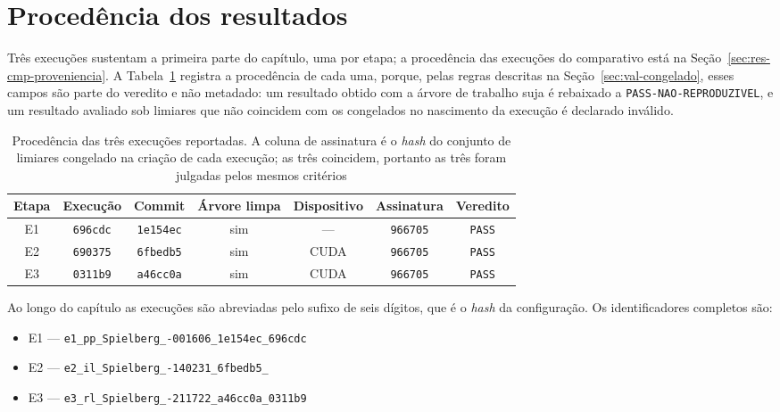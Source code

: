 \section{Procedência dos resultados}\label{sec:res-proveniencia}

Três execuções sustentam a primeira parte do capítulo, uma por etapa; a
procedência das execuções do comparativo está na
Seção~\ref{sec:res-cmp-proveniencia}. A
Tabela~\ref{tab:res_proveniencia} registra a procedência de cada uma, porque,
pelas regras descritas na Seção~\ref{sec:val-congelado}, esses campos são parte
do veredito e não metadado: um resultado obtido com a árvore de trabalho suja é
rebaixado a \texttt{PASS-NAO-REPRODUZIVEL}, e um resultado avaliado sob limiares
que não coincidem com os congelados no nascimento da execução é declarado
inválido.

\begin{table}[h]
    \centering
    \footnotesize
    \begin{tabular}{|c|c|c|c|c|c|c|}
        \hline
        \textbf{Etapa} & \textbf{Execução} & \textbf{Commit} &
        \textbf{Árvore limpa} & \textbf{Dispositivo} & \textbf{Assinatura} &
        \textbf{Veredito} \\
        \hline
        E1 & \texttt{696cdc} & \texttt{1e154ec} & sim & --- & \texttt{966705} &
        \texttt{PASS} \\
        \hline
        E2 & \texttt{690375} & \texttt{6fbedb5} & sim & CUDA & \texttt{966705} &
        \texttt{PASS} \\
        \hline
        E3 & \texttt{0311b9} & \texttt{a46cc0a} & sim & CUDA & \texttt{966705} &
        \texttt{PASS} \\
        \hline
    \end{tabular}
    \caption{Procedência das três execuções reportadas. A coluna de assinatura é
    o \textit{hash} do conjunto de limiares congelado na criação de cada
    execução; as três coincidem, portanto as três foram julgadas pelos mesmos
    critérios}
    \label{tab:res_proveniencia}
\end{table}

Ao longo do capítulo as execuções são abreviadas pelo sufixo de seis dígitos,
que é o \textit{hash} da configuração. Os identificadores completos são:

\begin{itemize}
    \item E1 --- \texttt{e1\_pp\_\allowbreak Spielberg\_-001606\_\allowbreak 1e154ec\_\allowbreak 696cdc}
    \item E2 --- \texttt{e2\_il\_\allowbreak Spielberg\_-140231\_\allowbreak 6fbedb5\_}
    \item E3 --- \texttt{e3\_rl\_\allowbreak Spielberg\_-211722\_\allowbreak a46cc0a\_\allowbreak 0311b9}
\end{itemize}

